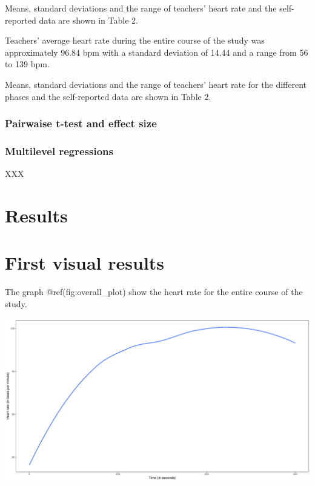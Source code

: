 \documentclass[
  man,floatsintext]{apa6}
\begin{document}
Means, standard deviations and the range of teachers' heart rate and the self-reported data are shown in Table 2.

Teachers' average heart rate during the entire course of the study was approximately 96.84 bpm with a standard deviation of 14.44 and a range from 56 to 139 bpm.

Means, standard deviations and the range of teachers' heart rate for the different phases and the self-reported data are shown in Table 2.

\hypertarget{pairwaise-t-test-and-effect-size}{%
\subsubsection{Pairwaise t-test and effect size}\label{pairwaise-t-test-and-effect-size}}

\hypertarget{multilevel-regressions}{%
\subsubsection{Multilevel regressions}\label{multilevel-regressions}}

XXX

\hypertarget{results}{%
\section{Results}\label{results}}

\hypertarget{first-visual-results}{%
\section{First visual results}\label{first-visual-results}}

The graph @ref(fig:overall\_plot) show the heart rate for the entire course of the study.

\includegraphics{fitbit_paper_files/figure-latex/overall_plot-1.pdf}
\end{document}
